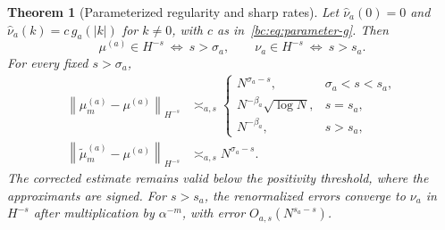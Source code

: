 \documentclass[11pt,a4paper,oneside,openany]{book}
\numberwithin{equation}{chapter}
\newtheorem{theorem}{Theorem}[chapter]
\theoremstyle{definition}
\theoremstyle{remark}
\newcommand{\norm}[1]{\left\lVert #1\right\rVert}
\newcommand{\mt}{\widetilde\mu}
\begin{document}
\begin{theorem}[Parameterized regularity and sharp rates]
\label{bc:thm:parameter-rates}
Let $\widehat\nu_a(0)=0$ and
$\widehat\nu_a(k)=c\,g_a(|k|)$ for $k\ne0$, with $c$ as
in~\eqref{bc:eq:parameter-g}. Then
\begin{equation}
 \mu^{(a)}\in H^{-s}\ \Longleftrightarrow\ s>\sigma_a,
 \qquad \nu_a\in H^{-s}\ \Longleftrightarrow\ s>s_a.
 \label{bc:eq:param-reg}
\end{equation}
For every fixed $s>\sigma_a$,
\begin{align}
 \norm{\mu_m^{(a)}-\mu^{(a)}}_{H^{-s}}
 &\asymp_{a,s}
 \begin{cases}
 N^{\sigma_a-s},&\sigma_a<s<s_a,\\
 N^{-\beta_a}\sqrt{\log N},&s=s_a,\\
 N^{-\beta_a},&s>s_a,
 \end{cases}\label{bc:eq:param-raw}\\
 \norm{\mt_m^{(a)}-\mu^{(a)}}_{H^{-s}}
 &\asymp_{a,s}N^{\sigma_a-s}.
 \label{bc:eq:param-corrected}
\end{align}
The corrected estimate remains valid below the positivity threshold, where the
approximants are signed. For $s>s_a$, the renormalized errors converge to
$\nu_a$ in $H^{-s}$ after multiplication by $\alpha^{-m}$, with error
$O_{a,s}(N^{s_a-s})$.
\end{theorem}
\end{document}
